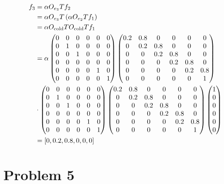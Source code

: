 \documentclass[12pt]{article}
\begin{document}
\begin{align*}
    f_3 &= \alpha O_{e_3} T f_2 \\
    &= \alpha O_{e_3} T \left (\alpha O_{e_2} T f_1 \right) \\
    &= \alpha O_{\text{cold}} T  O_{\text{cold}} T f_1 \\
    &= \alpha 
    \begin{pmatrix}
        0 & 0 & 0 & 0 & 0 & 0 \\
        0 & 1 & 0 & 0 & 0 & 0 \\
        0 & 0 & 1 & 0 & 0 & 0 \\
        0 & 0 & 0 & 0 & 0 & 0 \\
        0 & 0 & 0 & 0 & 1 & 0 \\
        0 & 0 & 0 & 0 & 0 & 1 \\
    \end{pmatrix}
    \begin{pmatrix}
        0.2 & 0.8 & 0 & 0 & 0 & 0 \\
        0 & 0.2 & 0.8 & 0 & 0 & 0 \\
        0 & 0 & 0.2 & 0.8 & 0 & 0 \\
        0 & 0 & 0 & 0.2 & 0.8 & 0 \\
        0 & 0 & 0 & 0 & 0.2 & 0.8 \\
        0 & 0 & 0 & 0 & 0 & 1 \\
    \end{pmatrix} \\
    & \cdot
    \begin{pmatrix}
        0 & 0 & 0 & 0 & 0 & 0 \\
        0 & 1 & 0 & 0 & 0 & 0 \\
        0 & 0 & 1 & 0 & 0 & 0 \\
        0 & 0 & 0 & 0 & 0 & 0 \\
        0 & 0 & 0 & 0 & 1 & 0 \\
        0 & 0 & 0 & 0 & 0 & 1 \\
    \end{pmatrix}
    \begin{pmatrix}
        0.2 & 0.8 & 0 & 0 & 0 & 0 \\
        0 & 0.2 & 0.8 & 0 & 0 & 0 \\
        0 & 0 & 0.2 & 0.8 & 0 & 0 \\
        0 & 0 & 0 & 0.2 & 0.8 & 0 \\
        0 & 0 & 0 & 0 & 0.2 & 0.8 \\
        0 & 0 & 0 & 0 & 0 & 1 \\
    \end{pmatrix}
    \begin{pmatrix}
        1 \\
        0 \\
        0 \\
        0 \\
        0 \\
        0 \\
    \end{pmatrix} \\
    &= [0, 0.2, 0.8, 0, 0, 0] \\
\end{align*}




\section{Problem 5}
\end{document}

